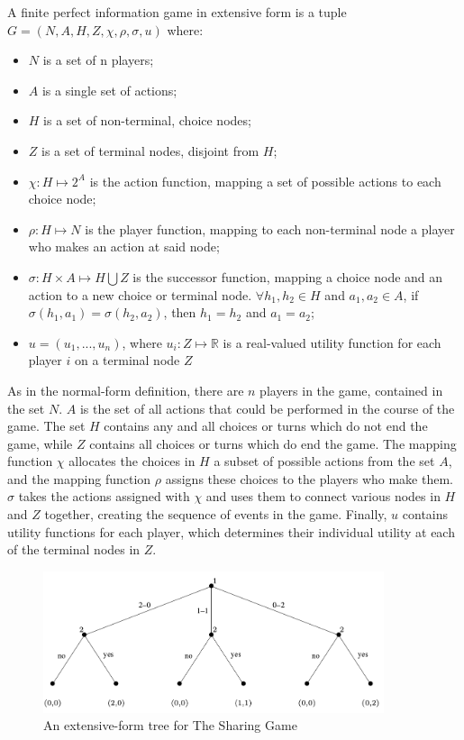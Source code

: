 \begin{define}
  A finite perfect information game in extensive form is a tuple $G = (N, A, H, Z, \chi, \rho, \sigma, u)$ where:
  \begin{itemize}
  \item $N$ is a set of n players;
  \item $A$ is a single set of actions;
  \item $H$ is a set of non-terminal, choice nodes;
  \item $Z$ is a set of terminal nodes, disjoint from $H$;
  \item $\chi: H\mapsto 2^A$ is the action function, mapping a set of possible actions to each choice node;
  \item $\rho: H\mapsto N$ is the player function, mapping to each non-terminal node a player who makes an action at said node;
  \item $\sigma: H\times A\mapsto H\bigcup Z$ is the successor function, mapping a choice node and an action to a new choice or terminal node. $\forall h_1, h_2\in H$ and $a_1, a_2\in A$, if $\sigma(h_1, a_1)=\sigma(h_2, a_2)$, then $h_1=h_2$ and $a_1=a_2$;
  \item $u=(u_1,...,u_n)$, where $u_i:Z\mapsto \mathbb{R}$ is a real-valued utility function for each player $i$ on a terminal node $Z$
  \end{itemize}
\end{define}

As in the normal-form definition, there are $n$ players in the game, contained in the set $N$. $A$ is the set of all actions that could be performed in the course of the game. The set $H$ contains any and all choices or turns which do not end the game, while $Z$ contains all choices or turns which do end the game. The mapping function $\chi$ allocates the choices in $H$ a subset of possible actions from the set $A$, and the mapping function $\rho$ assigns these choices to the players who make them. $\sigma$ takes the actions assigned with $\chi$ and uses them to connect various nodes in $H$ and $Z$ together, creating the sequence of events in the game. Finally, $u$ contains utility functions for each player, which determines their individual utility at each of the terminal nodes in $Z$.\\

\begin{figure}[H]
  \centering
  \includegraphics[width=10cm]{figures/ExampleTree.png}
  \caption{An extensive-form tree for The Sharing Game}
  \label{fig:sharingTree}
\end{figure}

